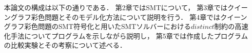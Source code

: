 %
%
%
%
%


本論文の構成は以下の通りである．
第2章ではSMTについて，
第3章ではクイーングラフ彩色問題とそのモデル化方法について説明を行う．
第4章ではクイーングラフ彩色問題のSMT符号化と用いたSMTソルバーにおける$distinct$制約の高速化手法についてプログラムを示しながら説明し，
第5章では作成したプログラムの比較実験とその考察について述べる．

